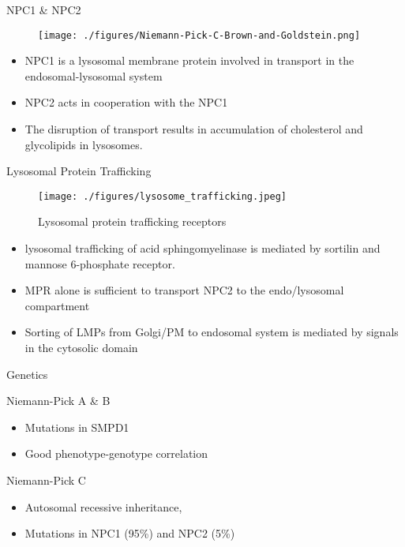\documentclass[presentation, smaller]{beamer}
\begin{document}
\begin{frame}[label={sec:orgheadline7}]{NPC1 \& NPC2}
\begin{figure}[htb]
\centering
\texttt{[image: ./figures/Niemann-Pick-C-Brown-and-Goldstein.png]}
\label{fig:}
\end{figure}

\footnotesize
\begin{itemize}
\item NPC1 is a lysosomal membrane protein involved in transport in the endosomal-lysosomal system
\item NPC2 acts in cooperation with the NPC1
\item The disruption of transport results in accumulation of cholesterol and glycolipids in lysosomes.
\end{itemize}
\end{frame}

\begin{frame}[label={sec:orgheadline8}]{Lysosomal Protein Trafficking}
\begin{figure}[htb]
\centering
\texttt{[image: ./figures/lysosome\_trafficking.jpeg]}
\caption[traf]{\label{fig:traf}
Lysosomal protein trafficking receptors}
\end{figure}

\footnotesize
\begin{itemize}
\item lysosomal trafficking of acid sphingomyelinase is mediated by sortilin and mannose 6-phosphate receptor.
\item MPR alone is sufficient to transport NPC2 to the endo/lysosomal compartment
\item Sorting of LMPs from Golgi/PM to endosomal system is mediated by
signals in the cytosolic domain
\end{itemize}
\end{frame}

\begin{frame}[label={sec:orgheadline9}]{Genetics}
\begin{block}{Niemann-Pick A \& B}
\begin{itemize}
\item Mutations in SMPD1
\item Good phenotype-genotype correlation
\end{itemize}
\end{block}
\begin{block}{Niemann-Pick C}
\begin{itemize}
\item Autosomal recessive inheritance,
\item Mutations in NPC1 (95\%) and NPC2 (5\%)
\end{itemize}
\end{block}
\end{frame}
\end{document}
